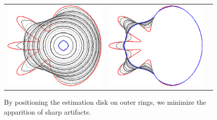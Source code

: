 \begin{figure}
\begin{tabular}{ccc}
\includegraphics[scale=0.22]{figures/chapter6/level-effect/flower/improve/len_pen0/radius-9/level6/summary.pdf} &
\includegraphics[scale=0.22]{figures/chapter6/level-effect/flower/improve/len_pen0/radius-9/level9/summary.pdf}
\end{tabular}
\caption{ By positioning the estimation disk on outer rings, we minimize the apparition of sharp artifacts. %
}
\label{ch6:fig:mrings-r9-evolution}
\end{figure}




